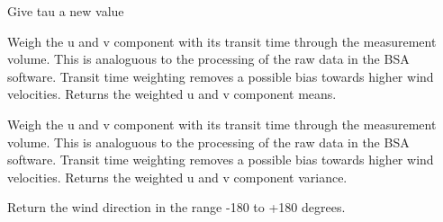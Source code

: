 \documentclass[letterpaper,10pt,english]{sphinxmanual}
\begin{document}
\begin{fulllineitems}
\begin{fulllineitems}
\end{fulllineitems}


\begin{fulllineitems}
\label{\detokenize{index:windtunnel.Timeseries.set_tau}}
Give tau a new value

\end{fulllineitems}


\begin{fulllineitems}
\label{\detokenize{index:windtunnel.Timeseries.weighted_component_mean}}
Weigh the u and v component with its transit time through the
measurement volume. This is analoguous to the processing of the raw
data in the BSA software. Transit time weighting removes a possible
bias towards higher wind velocities. Returns the weighted u and v
component means.

\end{fulllineitems}


\begin{fulllineitems}
\label{\detokenize{index:windtunnel.Timeseries.weighted_component_variance}}
Weigh the u and v component with its transit time through the
measurement volume. This is analoguous to the processing of the raw
data in the BSA software. Transit time weighting removes a possible
bias towards higher wind velocities. Returns the weighted u and v
component variance.

\end{fulllineitems}


\begin{fulllineitems}
\label{\detokenize{index:windtunnel.Timeseries.wind_direction_mag_less_180}}
Return the wind direction in the range -180 to +180 degrees.

\end{fulllineitems}


\end{fulllineitems}
\end{document}
